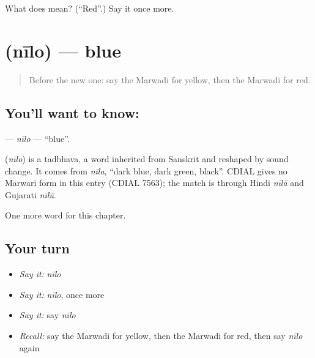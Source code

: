 \begin{tcolorbox}[breakable,colback=teal!4,colframe=teal!35!black,title={Before you move on}]
What does  mean? (\textquotedblleft{}Red\textquotedblright{}.) Say it once more.
\end{tcolorbox}
\section[\texorpdfstring{\mw{नीलो} (nīlo)}{नीलो (nīlo)}]{ (nīlo) — blue}

\label{lesson:MW-C77-nilo}



\begin{quote}
Before the new one: say the Marwadi for yellow, then the Marwadi for red.
\end{quote}

\subsection*{You'll want to know: }
\textbf{} — \emph{nīlo} — \textquotedblleft{}blue\textquotedblright{}.

\begin{cousinweb}
\textbf{} (\emph{nīlo}) is a tadbhava, a word inherited from Sanskrit and reshaped by sound change. It comes from \emph{nīla}, \textquotedblleft{}dark blue, dark green, black\textquotedblright{}. CDIAL gives no Marwari form in this entry (CDIAL 7563); the match is through Hindi \emph{nīlā} and Gujarati \emph{nīlũ}.
\end{cousinweb}

\begin{grammarlens}[title={What you've built}]
One more word for this chapter.
\end{grammarlens}

\subsection*{Your turn}
\begin{itemize}
\raggedright
  \item \emph{Say it:} \emph{nīlo}
  \item \emph{Say it:} \emph{nīlo}, once more
  \item \emph{Say it:} say \emph{nīlo}
  \item \emph{Recall:} say the Marwadi for yellow, then the Marwadi for red, then say \emph{nīlo} again
\end{itemize}


